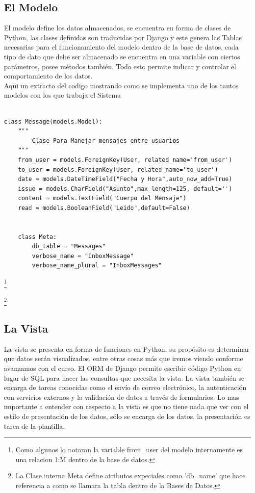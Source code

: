 \subsection{El Modelo}

El modelo define los datos almacenados, se encuentra en forma de clases de
Python, las clases definidas son traducidas por Django y este genera las Tablas
necesarias para el funcionamiento del modelo dentro de la base de datos, cada
tipo de dato que debe ser almacenado se encuentra en una variable 
con ciertos parámetros, posee métodos también. Todo esto permite indicar y
controlar el comportamiento de los datos.\\[0.1cm]

Aqui un extracto del codigo mostrando como se implementa uno de los tantos
modelos con los que trabaja el Sistema\\[0.3cm]


\begin{lstlisting}[style=Python]

class Message(models.Model):
    """
        Clase Para Manejar mensajes entre usuarios
    """
    from_user = models.ForeignKey(User, related_name='from_user')
    to_user = models.ForeignKey(User, related_name='to_user')
    date = models.DateTimeField("Fecha y Hora",auto_now_add=True)
    issue = models.CharField("Asunto",max_length=125, default='')
    content = models.TextField("Cuerpo del Mensaje")
    read = models.BooleanField("Leido",default=False)


    class Meta:
        db_table = "Messages"
        verbose_name = "InboxMessage"
        verbose_name_plural = "InboxMessages"
\end{lstlisting}

\footnote{Como algunos lo notaran la variable from\_user del modelo internamente
es una relacion 1:M dentro de la base de datos.}

\footnote{La Clase interna Meta define atributos expeciales como 'db\_name' que hace
referencia a como se llamara la tabla dentro de la Bases de Datos.}

\vspace{0.1cm}

\subsection{La Vista}
La vista se presenta en forma de funciones en Python, su propósito es
determinar que datos serán visualizados, entre otras cosas más que iremos
viendo conforme avanzamos con el curso. El ORM de Django permite escribir
código Python en lugar de SQL para hacer las consultas que necesita la vista.
La vista también se encarga de tareas conocidas como el envío de correo
electrónico, la autenticación con servicios externos y la validación de
datos a través de formularios. Lo mas importante a entender con respecto a la
 vista es que no tiene nada que ver con el estilo de presentación de los
 datos, sólo se encarga de los datos, la presentación es tarea de la plantilla.\\[0.1cm]


